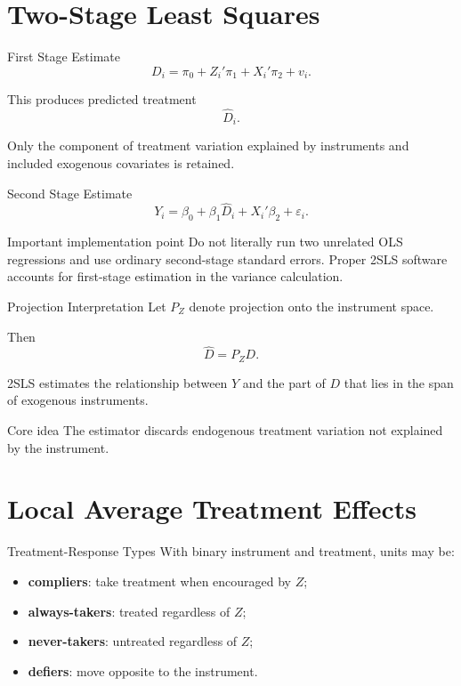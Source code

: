 \documentclass[aspectratio=169,11pt]{beamer}
\begin{document}
\section{Two-Stage Least Squares}

\begin{frame}{First Stage}
Estimate
\[
D_i=\pi_0+Z_i'\pi_1+X_i'\pi_2+v_i.
\]

This produces predicted treatment
\[
\widehat D_i.
\]

Only the component of treatment variation explained by instruments and included exogenous covariates is retained.
\end{frame}

\begin{frame}{Second Stage}
Estimate
\[
Y_i=\beta_0+\beta_1\widehat D_i+X_i'\beta_2+\varepsilon_i.
\]

\begin{alertblock}{Important implementation point}
Do not literally run two unrelated OLS regressions and use ordinary second-stage standard errors. Proper 2SLS software accounts for first-stage estimation in the variance calculation.
\end{alertblock}
\end{frame}

\begin{frame}{Projection Interpretation}
Let \(P_Z\) denote projection onto the instrument space.

Then
\[
\widehat D=P_ZD.
\]

2SLS estimates the relationship between \(Y\) and the part of \(D\) that lies in the span of exogenous instruments.

\begin{block}{Core idea}
The estimator discards endogenous treatment variation not explained by the instrument.
\end{block}
\end{frame}

\section{Local Average Treatment Effects}

\begin{frame}{Treatment-Response Types}
With binary instrument and treatment, units may be:
\begin{itemize}
\item \textbf{compliers}: take treatment when encouraged by \(Z\);
\item \textbf{always-takers}: treated regardless of \(Z\);
\item \textbf{never-takers}: untreated regardless of \(Z\);
\item \textbf{defiers}: move opposite to the instrument.
\end{itemize}
\end{frame}
\end{document}
